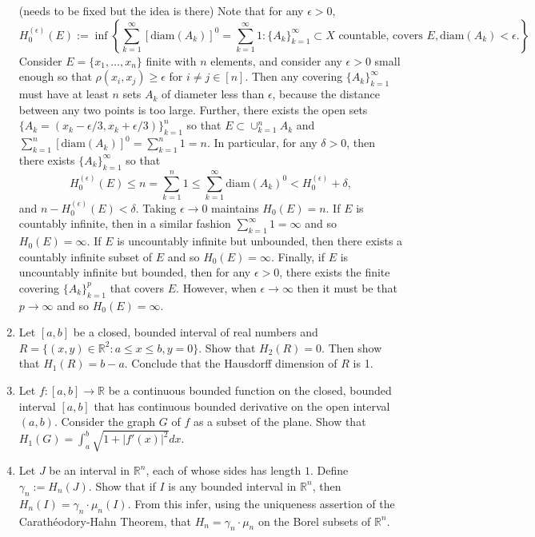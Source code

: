 \begin{enumerate}
    (needs to be fixed but the idea is there) Note that for any $\epsilon>0$,
    \[
    H_0^{(\epsilon)}(E):=\inf
    \left\{
        \sum_{k=1}^\infty[\text{diam}(A_k)]^0=\sum_{k=1}^\infty 1:\{A_k\}_{k=1}^\infty\subset X\text{ countable, covers }E,\text{diam}(A_k)<\epsilon.
    \right\}
    \]
    Consider $E=\{x_1,\dots,x_n\}$ finite with $n$ elements, and consider any $\epsilon>0$ small enough so that $\rho(x_i,x_j)\ge\epsilon$ for $i\neq j\in[n]$.
    Then any covering $\{A_k\}_{k=1}^\infty$ must have at least $n$ sets $A_k$ of diameter less than $\epsilon$, because the distance between any two points is too large.
    Further, there exists the open sets $\{A_k=(x_k-\epsilon/3,x_k+\epsilon/3)\}_{k=1}^n$ so that $E\subset\cup_{k=1}^nA_k$ and $\sum_{k=1}^n[\text{diam}(A_k)]^0=\sum_{k=1}^n1=n$.
    In particular, for any $\delta>0$, then there exists $\{A_k\}_{k=1}^\infty$ so that
    \[
        H_0^{(\epsilon)}(E)\le n=\sum_{k=1}^n1\le\sum_{k=1}^\infty \text{diam}(A_k)^0<H_0^{(\epsilon)}+\delta,
    \]
    and $n-H_0^{(\epsilon)}(E)<\delta$.
    Taking $\epsilon\to0$ maintains $H_0(E)=n$.
    If $E$ is countably infinite, then in a similar fashion $\sum_{k=1}^\infty1=\infty$ and so $H_0(E)=\infty$.
    If $E$ is uncountably infinite but unbounded, then there exists a countably infinite subset of $E$ and so $H_0(E)=\infty$.
    Finally, if $E$ is uncountably infinite but bounded, then for any $\epsilon>0$, there exists the finite covering $\{A_k\}_{k=1}^p$ that covers $E$.
    However, when $\epsilon\to\infty$ then it must be that $p\to\infty$ and so $H_0(E)=\infty$. 
    
    \item Let $[a,b]$ be a closed, bounded interval of real numbers and $R=\{(x,y)\in\mathbb{R}^2:a\le x\le b,y=0\}$.
    Show that $H_2(R)=0$.
    Then show that $H_1(R)=b-a$.
    Conclude that the Hausdorff dimension of $R$ is 1.
    \item Let $f:[a,b]\to\mathbb{R}$ be a continuous bounded function on the closed, bounded interval $[a,b]$ that has continuous bounded derivative on the open interval $(a,b)$.
    Consider the graph $G$ of $f$ as a subset of the plane.
    Show that $H_1(G)=\int_a^b\sqrt{1+|f'(x)|^2}dx$.
    \item Let $J$ be an interval in $\mathbb{R}^n$, each of whose sides has length $1$.
    Define $\gamma_n:=H_n(J)$.
    Show that if $I$ is any bounded interval in $\mathbb{R}^n$, then $H_n(I)=\gamma_n\cdot\mu_n(I)$.
    From this infer, using the uniqueness assertion of the Carath\'eodory-Hahn Theorem, that $H_n=\gamma_n\cdot\mu_n$ on the Borel subsets of $\mathbb{R}^n$.
\end{enumerate}
